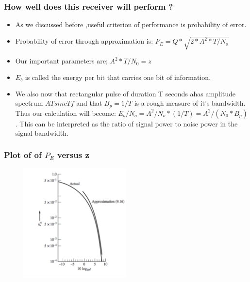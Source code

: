 \documentclass{beamer}
\begin{document}
			\begin{frame}
			\frametitle{How well does this receiver will perform ?}
			\begin{itemize}
			\item As we discussed before ,useful criterion of performance is probability of error. 
			\item Probability of error through approximation is: $P_E= Q *\sqrt{2*A^2*T/N_o}$
			\item Our important parameters are; $A^2*T/N_0=z$
			\item $E_b$ is called the energy per bit that carries one bit of information.
			\item We also now that rectangular pulse of duration T seconds ahas amplitude spectrum $ATsincTf$ and that $B_p=1/T$ is a rough measure of it's bandwidth. Thus our calculation will become: $E_b/N_o=A^2/N_o*(1/T)=A^2/(N_0*B_p)$. This can be interpreted as the ratio of signal power to noise power in the signal bandwidth.
			\end{itemize}
			\end{frame}
			
			\begin{frame}
			\frametitle{Plot of of $P_E$ versus z}
			\begin{figure}
			\includegraphics[width=0.5\textwidth]{P_E graph.png}
			\end{figure}
			\end{frame}
			
\end{document}
